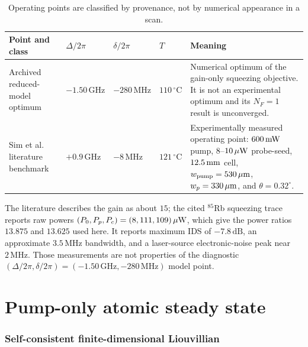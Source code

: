 \documentclass[11pt,a4paper]{article}
\newcommand{\GHz}{\,\mathrm{GHz}}
\newcommand{\MHz}{\,\mathrm{MHz}}
\newcommand{\dB}{\,\mathrm{dB}}
\newcommand{\degC}{\,^{\circ}\mathrm C}
\begin{document}
\begin{table}[ht]
\centering
\caption{Operating points are classified by provenance, not by numerical
appearance in a scan.}
\label{tab:operating-points}
\small
\begin{tabularx}{\textwidth}{L{3.2cm}C{2.0cm}C{2.0cm}C{1.7cm}Y}
\toprule
Point and class & $\Delta/2\pi$ & $\delta/2\pi$ & $T$ & Meaning\\
\midrule
Archived reduced-model optimum &
$-1.50\GHz$ & $-280\MHz$ & $110\degC$ &
Numerical optimum of the gain-only squeezing objective. It is not an
experimental optimum and its $N_F=1$ result is unconverged.\\
Sim et al. literature benchmark \cite{Sim2025} &
$+0.9\GHz$ & $-8\MHz$ & $121\degC$ &
Experimentally measured operating point: $600\,{\rm mW}$ pump,
$8$--$10\,\mu{\rm W}$ probe-seed, $12.5\,{\rm mm}$ cell,
$w_{\rm pump}=530\,\mu{\rm m}$, $w_p=330\,\mu{\rm m}$, and
$\theta=0.32^\circ$.\\
\bottomrule
\end{tabularx}
\end{table}

The literature describes the gain as about $15$; the cited $^{85}$Rb squeezing
trace reports raw powers $(P_0,P_p,P_c)=(8,111,109)\,\mu{\rm W}$, which give
the power ratios $13.875$ and $13.625$ used here.
It reports maximum IDS of $-7.8\dB$, an approximate $3.5\MHz$
bandwidth, and a laser-source electronic-noise peak near $2\MHz$. Those
measurements are not properties of the diagnostic
$(\Delta/2\pi,\delta/2\pi)=(-1.50\GHz,-280\MHz)$ model point.

\part{Pump-only atomic steady state}

\section{Self-consistent finite-dimensional Liouvillian}
\end{document}
